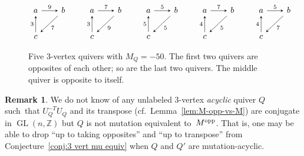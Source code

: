 \documentclass[11pt, letterpaper]{amsart}
\theoremstyle{definition}
\newtheorem{remark}[theorem]{Remark}
\numberwithin{equation}{section}
\def\ZZ{{\mathbb Z}}
\def\GL{{\operatorname{GL}}}
\begin{document}
\begin{figure}[ht]
\begin{center}
\vspace{-10pt}
\begin{equation*}
 \begin{tikzcd}[arrows={-stealth}, sep=2em]
  a  \arrow[r,  "9"]   
  & b  \arrow[dl, "7"]
  \\
 c  \arrow[u, "3"] 
   & 
\end{tikzcd}
\qquad 
 \begin{tikzcd}[arrows={-stealth}, sep=2em]
  a  \arrow[r,  "7"]   
  & b  \arrow[dl, "9"]
  \\
 c  \arrow[u, "3"] 
   & 
\end{tikzcd}
\qquad 
 \begin{tikzcd}[arrows={-stealth}, sep=2em]
  a  \arrow[r,  "5"]   
  & b  \arrow[dl, "5"]
  \\
 c  \arrow[u, "5"] 
   & 
\end{tikzcd}
\qquad  
 \begin{tikzcd}[arrows={-stealth}, sep=2em]
  a  \arrow[r,  "7"]   
  & b  \arrow[dl, "5"]
  \\
 c  \arrow[u, "4"] 
   & 
\end{tikzcd}
\qquad
 \begin{tikzcd}[arrows={-stealth}, sep=2em]
  a  \arrow[r,  "5"]   
  & b  \arrow[dl, "7"]
  \\
 c  \arrow[u, "4"] 
   & 
\end{tikzcd}
\end{equation*}
\end{center}
\caption{Five 3-vertex quivers with $M_Q=-50$.
The first two quivers are opposites of each other; so are the last two quivers.
The middle quiver is opposite to itself.}
\vspace{-10pt}
\label{fig:5-quivers}
\end{figure}

\begin{remark}
\label{rem:3vert mu acyclic opposites}
We do not know of any unlabeled $3$-vertex \emph{acyclic} quiver $Q$ such~that 
$U_Q^{-T} U_Q$ and its transpose (cf.\ Lemma~\ref{lem:M-opp-vs-M}) 
are conjugate in $\GL(n,\ZZ)$ 
but $Q$ is not mutation equivalent to~$M^{\textup{opp}}$. 
That is, one may be able to drop ``up to taking opposites'' and ``up to transpose'' from Conjecture~\ref{conj:3 vert mu equiv} when $Q$ and $Q'$ are mutation-acyclic. 
\end{remark}
 
\end{document}
